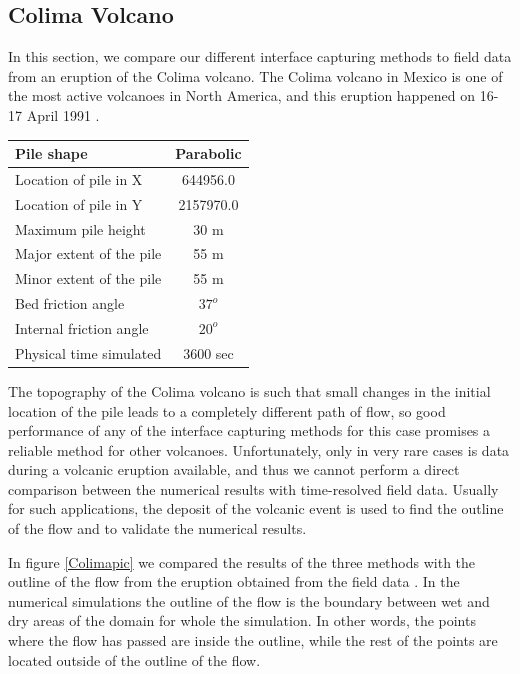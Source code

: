 \documentclass[review]{elsarticle}
\begin{document}
\subsection{Colima Volcano}
In this section, we compare our different interface capturing methods to field data from an eruption of the Colima volcano. 
The Colima volcano in Mexico is one of the most active volcanoes in North America, and this eruption happened on 16-17 April 1991 \cite{Charbonnier2008}. 
\begin{center}
        \begin{tabular}{|l|c|}
                \hline
                Pile shape       & Parabolic \\
                \hline
                Location of pile in X     & 644956.0 \\
                \hline
                Location of pile in Y     & 2157970.0 \\
                \hline
                Maximum pile height       & 30 m \\
                \hline
                Major extent of the pile  & 55 m \\
                \hline
                Minor extent of the pile  & 55 m \\
                \hline           
                Bed friction angle        & $37^o$ \\
                \hline
                Internal friction angle  & $20^o$ \\
                \hline
                Physical time simulated  & 3600 sec \\
                \hline
        \end{tabular}
\end{center}
The topography of the Colima volcano is such that small changes in the initial location of the pile leads to a completely different 
path of flow, so good performance of any of the interface capturing methods for this case promises a reliable method for other volcanoes. 
Unfortunately, only in very rare cases is data during a volcanic eruption available, and thus we cannot perform a direct comparison between the numerical results 
with time-resolved field data.
Usually for such applications, the deposit of the volcanic event is used to find the outline of the flow and to validate the numerical results.

In figure \ref{Colimapic} we compared the results of the three methods with the outline of the flow from the eruption obtained from the field data \cite{Rupp2006}. 
In the numerical simulations the outline of the flow is the boundary between wet and dry areas of the domain for whole the simulation. In other words, the points where the flow has
passed are inside the outline, while the rest of the points are located outside of the outline of the flow. 
\end{document}
